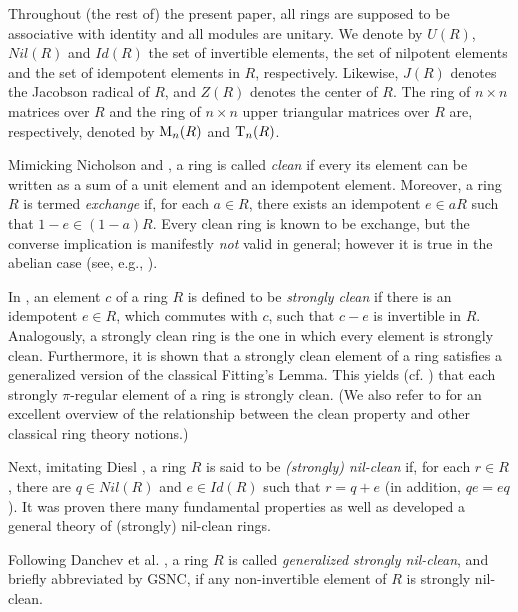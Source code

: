 \documentclass[12pt]{amsart}
\theoremstyle{definition}
\begin{document}
Throughout (the rest of) the present paper, all rings are supposed to be associative with identity and all modules are unitary. We denote by $U(R)$, $Nil(R)$ and $Id(R)$ the set of invertible elements, the set of nilpotent elements and the set of idempotent elements in $R$, respectively. Likewise, $J(R)$ denotes the Jacobson radical of $R$, and $Z(R)$ denotes the center of $R$. The ring of $n\times n$ matrices over $R$ and the ring of $n\times n$ upper triangular matrices over $R$ are, respectively, denoted by ${\rm M}_{n}(R)$ and ${\rm T}_{n}(R)$.

\medskip

Mimicking Nicholson \cite{16} and \cite{17}, a ring is called {\it clean} if every its element can be written as a sum of a unit element and an idempotent element. Moreover, a ring $R$ is termed {\it exchange} if, for each $a \in R$, there exists an idempotent $ e \in aR$ such that $1-e \in (1-a)R$. Every clean ring is known to be exchange, but the converse implication is manifestly {\it not} valid in general; however it is true in the abelian case (see, e.g., \cite[Proposition 1.8]{3}).

In \cite{17}, an element $c$ of a ring $R$ is defined to be {\it strongly clean} if there is an idempotent $e\in R$, which commutes with $c$, such that $c-e$ is invertible in $R$. Analogously, a strongly clean ring is the one in which every element is strongly clean. Furthermore, it is shown that a strongly clean element of a ring satisfies a generalized version of the classical Fitting's Lemma. This yields (cf. \cite[Section 10]{Boro}) that each strongly $\pi$-regular element of a ring is strongly clean. (We also refer to \cite{ckl} for an excellent overview of the relationship between the clean property and other classical ring theory notions.)

\medskip

Next, imitating Diesl \cite{2}, a ring $R$ is said to be {\it (strongly) nil-clean} if, for each $r\in R$, there are $q\in Nil(R)$ and $e\in Id(R)$ such that $r=q+e$ (in addition, $qe=eq$). It was proven there many fundamental properties as well as developed a general theory of (strongly) nil-clean rings.

\medskip

Following Danchev et al. \cite{5}, a ring $R$ is called {\it generalized strongly nil-clean}, and briefly abbreviated by GSNC, if any non-invertible element of $R$ is strongly nil-clean.

\medskip
\end{document}
